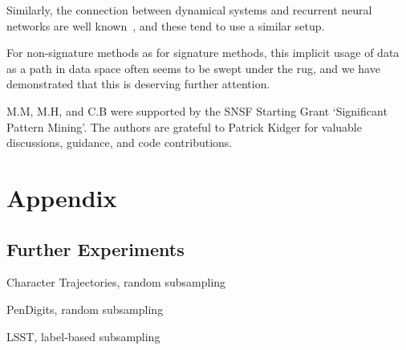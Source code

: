 \documentclass{article}
\begin{document}
Similarly, the connection between dynamical systems and recurrent neural
networks are well known~\citep{FUNAHASHI1993801, continuousrnn}, and these tend to use a similar setup.

For non-signature methods as for signature methods, this implicit usage of data as a path in data space often seems to be swept under the rug, and we have demonstrated that this is deserving further attention.

\begin{ack}
M.M, M.H, and C.B were supported by the SNSF Starting Grant `Significant
Pattern Mining'. The authors are grateful to Patrick Kidger for valuable discussions, guidance, and code contributions.
\end{ack}


\newpage
\appendix

\section{Appendix}\label{sec:Appendix}

\subsection{Further Experiments}\label{supp:Experiments}

\begin{table}[htbp]
    \begin{center}
	\caption{Character Trajectories, random subsampling}
	
	\label{supp: tab character}
	\end{center}
\end{table}

\begin{table}[htbp]
    \begin{center}
	\caption{PenDigits, random subsampling}
	
	\label{supp: tab pendigits}
	\end{center}
\end{table}

\begin{table}[htbp]
    \begin{center}
	\caption{LSST, label-based subsampling}
	
	\label{supp: tab lsst label-based}
	\end{center}
\end{table}
\end{document}
